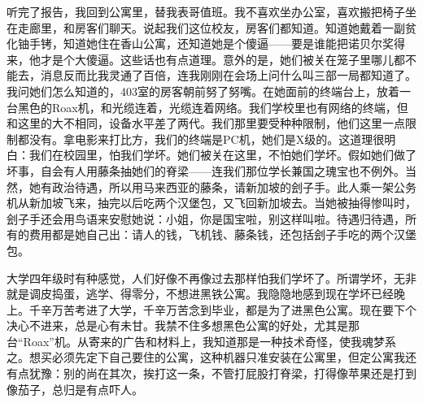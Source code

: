 听完了报告，我回到公寓里，替我表哥值班。我不喜欢坐办公室，喜欢搬把椅子坐在走廊里，和房客们聊天。说起我们这位校友，房客们都知道。知道她戴着一副贫化铀手铐，知道她住在香山公寓，还知道她是个傻逼——要是谁能把诺贝尔奖得来，他才是个大傻逼。这些话也有点道理。意外的是，她们被关在笼子里哪儿都不能去，消息反而比我灵通了百倍，连我刚刚在会场上问什么叫三部一局都知道了。我问她们怎么知道的，403室的房客朝前努了努嘴。在她面前的终端台上，放着一台黑色的Roax机，和光缆连着，光缆连着网络。我们学校里也有网络的终端，但和这里的大不相同，设备水平差了两代。我们那里要受种种限制，他们这里一点限制都没有。拿电影来打比方，我们的终端是PC机，她们是X级的。这道理很明白：我们在校园里，怕我们学坏。她们被关在这里，不怕她们学坏。假如她们做了坏事，自会有人用藤条抽她们的脊梁——连我们那位学长兼国之瑰宝也不例外。当然，她有政治待遇，所以用马来西亚的藤条，请新加坡的刽子手。此人乘一架公务机从新加坡飞来，抽完以后吃两个汉堡包，又飞回新加坡去。当她被抽得惨叫时，刽子手还会用鸟语来安慰她说：小姐，你是国宝啦，别这样叫啦。待遇归待遇，所有的费用都是她自己出：请人的钱，飞机钱、藤条钱，还包括刽子手吃的两个汉堡包。 

大学四年级时有种感觉，人们好像不再像过去那样怕我们学坏了。所谓学坏，无非就是调皮捣蛋，逃学、得零分，不想进黑铁公寓。我隐隐地感到现在学坏已经晚上。千辛万苦考进了大学，千辛万苦念到毕业，都是为了进黑色公寓。现在要下个决心不进来，总是心有未甘。我禁不住多想黑色公寓的好处，尤其是那台“Roax”机。从寄来的广告和材料上，我知道那是一种技术奇怪，使我魂梦系之。想买必须先定下自己要住的公寓，这种机器只准安装在公寓里，但定公寓我还有点犹豫：别的尚在其次，挨打这一条，不管打屁股打脊梁，打得像苹果还是打到像茄子，总归是有点吓人。
